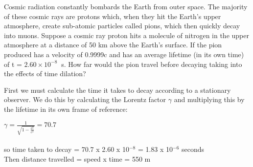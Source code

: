 \documentclass[revision-guide.tex]{subfiles}
\begin{document}
 
\begin{figure}[h]
	\begin{center}	
	\end{center}
\end{figure}




\begin{example}

Cosmic radiation constantly bombards the Earth from outer space. The majority of these cosmic rays are protons which, when they hit the Earth’s upper atmosphere, create sub-atomic particles called pions, which then quickly decay into muons. Suppose a cosmic ray proton hits a molecule of nitrogen in the upper atmosphere at a distance of 50 km above the Earth’s surface. If the pion produced has a velocity of 0.9999c and has an average lifetime (in its own time) of t = $2.60 \times 10^{-8}\ $ s. How far would the pion travel before decaying taking into the effects of time dilation?

\answer 

First we must calculate the time it takes to decay according to a stationary observer. We do this by calculating the Lorentz factor $\gamma$ and multiplying this by the lifetime in its own frame of reference:

$\gamma = \frac{1}{\sqrt{1-\frac{v^2}{c^2}}} = 70.7$
\\
\\
so time taken to decay = 70.7 x 2.60 x 10$^{-8}$ = 1.83 x 10$^{-6}$ seconds
\\
Then distance travelled = speed x time = 550 m
\end{example}

\\
\end{document}

